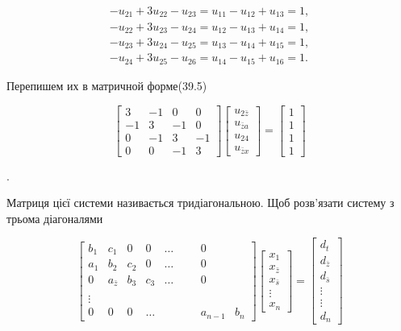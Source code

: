 \documentclass[
  ukrainian,
]{article}
\begin{document}
\[
\begin{array}{l} -u_{21}+3u_{22}-u_{23}=u_{11}-u_{12}+u_{13}=1,\\ -u_{22}+3u_{23}-u_{24}=u_{12}-u_{13}+u_{14}=1,\\ -u_{23}+3u_{24}-u_{25}=u_{13}-u_{14}+u_{15}=1,\\ -u_{24}+3u_{25}-u_{26}=u_{14}-u_{15}+u_{16}=1. \end{array}
\]

Перепишем их в матричной форме(39.5)

\[
\begin{bmatrix} 3 & -1 & 0 & 0 \\ -1 & 3 & -1 & 0 \\ 0 & -1 & 3 & -1 \\ 0 & 0 & -1 & 3 \end{bmatrix}
\begin{bmatrix} u_{2\bar{z}} \\ u_{\bar{z}a} \\ u_{24} \\ u_{\bar{z}x} \end{bmatrix}
=
\begin{bmatrix} 1 \\ 1 \\ 1 \\ 1 \end{bmatrix}
\]

.

Матриця цієї системи називається тридіагональною. Щоб розв'язати систему
з трьома діагоналями

\[
\begin{bmatrix} b_1 & c_1 & 0 & 0 & \dots & & & 0 \\ a_1 & b_2 & c_2 & 0 & \dots & & & 0 \\ 0 & a_{\bar{z}} & b_3 & c_3 & \dots & & & 0 \\ & & & & & & & & \\ \vdots & & & & & & & & \\ 0 & 0 & 0 & \dots & & & & a_{n-1} & b_n \end{bmatrix}
\begin{bmatrix} x_1 \\ x_{\bar{z}} \\ x_{\bar{s}} \\ \vdots \\ x_n \end{bmatrix}
=
\begin{bmatrix} d_t \\ d_{\bar{z}} \\ d_{\bar{s}} \\ \vdots \\ \vdots \\ d_n \end{bmatrix}
\]
\end{document}
